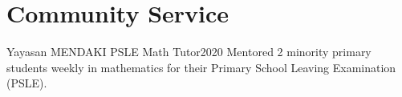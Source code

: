 \documentclass[../main.tex]{subfiles}
\begin{document}
\section{Community Service}
  \vspace{2pt}
  \resumeSubHeadingListStart

    \layoutAwards
    {Yayasan MENDAKI PSLE Math Tutor}{2020}
    {Mentored 2 minority primary students weekly in mathematics for their Primary School Leaving Examination (PSLE).}

  \resumeSubHeadingListEnd
\end{document}

